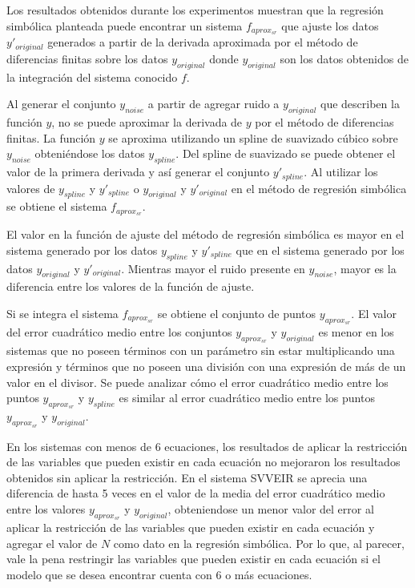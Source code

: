 Los resultados obtenidos durante los experimentos muestran que la regresión simbólica planteada puede encontrar un sistema $f_{aprox_{sr}}$ que ajuste los datos $y'_{original}$ generados a partir de la derivada aproximada por el método de diferencias finitas sobre los datos $y_{original}$ donde $y_{original}$ son los datos obtenidos de la integración del sistema conocido $f$.

Al generar el conjunto $y_{noise}$ a partir de agregar ruido a $y_{original}$ que describen la función $y$, no se puede aproximar la derivada de $y$ por el método de diferencias finitas. La función $y$ se aproxima utilizando un spline de suavizado cúbico sobre $y_{noise}$ obteniéndose los datos $y_{spline}$. Del spline de suavizado se puede obtener el valor de la primera derivada y así generar el conjunto $y'_{spline}$. Al utilizar los valores de $y_{spline}$ y $y'_{spline}$ o $y_{original}$ y $y'_{original}$ en el método de regresión simbólica se obtiene el sistema $f_{aprox_{sr}}$.

El valor en la función de ajuste del método de regresión simbólica es mayor en el sistema generado por los datos $y_{spline}$ y $y'_{spline}$ que en el sistema generado por los datos $y_{original}$ y $y'_{original}$. Mientras mayor el ruido presente en $y_{noise}$, mayor es la diferencia entre los valores de la función de ajuste.


Si se integra el sistema $f_{aprox_{sr}}$ se obtiene el conjunto de puntos $y_{aprox_{sr}}$. El valor del error cuadrático medio entre los conjuntos $y_{aprox_{sr}}$ y $y_{original}$ es menor en los sistemas que no poseen términos con un parámetro sin estar multiplicando una expresión y términos que no poseen una división con una expresión de más de un valor en el divisor. Se puede analizar cómo el error cuadrático medio entre los puntos $y_{aprox_{sr}}$ y $y_{spline}$ es similar al error cuadrático medio entre los puntos $y_{aprox_{sr}}$ y $y_{original}$.

En los sistemas con menos de 6 ecuaciones, los resultados de aplicar la restricción de las variables que pueden existir en cada ecuación no mejoraron los resultados obtenidos sin aplicar la restricción. En el sistema SVVEIR se aprecia una diferencia de hasta 5 veces en el valor de la media del error cuadrático medio entre los valores $y_{aprox_{sr}}$ y $y_{original}$, obteniendose un menor valor del error al aplicar la restricción de las variables que pueden existir en cada ecuación y agregar el valor de $N$ como dato en la regresión simbólica. Por lo que, al parecer, vale la pena restringir las variables que pueden existir en cada ecuación si el modelo que se desea encontrar cuenta con 6 o más ecuaciones.

